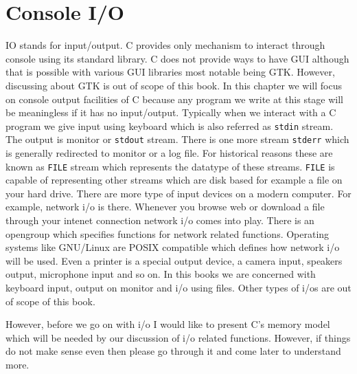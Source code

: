 \chapter{Console I/O}
IO stands for input/output. C provides only mechanism to interact through
console using its standard library. C does not provide ways to have GUI
although that is possible with various GUI libraries most notable being
GTK. However, discussing about GTK is out of scope of this book. In this
chapter we will focus on console output facilities of C because any program we
write at this stage will be meaningless if it has no input/output. Typically
when we interact with a C program we give input using keyboard which is also
referred as \texttt{stdin} stream. The output is monitor or \texttt{stdout}
stream. There is one more stream \texttt{stderr} which is generally redirected
to monitor or a log file. For historical reasons these are known as
\texttt{FILE} stream which represents the datatype of these
streams. \texttt{FILE} is capable of representing other streams which are disk
based for example a file on your hard drive. There are more type of input
devices on a modern computer. For example, network i/o is there. Whenever you
browse web or download a file through your intenet connection network i/o comes
into play. There is an opengroup
which specifies functions for network related functions. Operating systems
like GNU/Linux are POSIX compatible which defines how network i/o will be
used. Even a printer is a special output device, a camera input, speakers
output, microphone input and so on. In this books we are concerned with
keyboard input, output on monitor and i/o using files. Other types of i/os are
out of scope of this book.

However, before we go on with i/o I would
like to present C's memory model which will be needed by our discussion of i/o
related functions. However, if things do not make sense even then please go
through it and come later to understand more. 